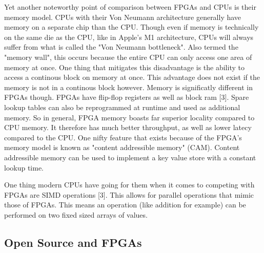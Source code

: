 \documentclass{article}
\begin{document}
    Yet another noteworthy point of comparison between FPGAs and CPUs is their memory model.
    CPUs with their Von Neumann architecture generally have memory on a separate chip
    than the CPU. Though even if memory is technically on the same die as the CPU, like in Apple's
    M1 architecture, CPUs will always suffer from what is called the "Von Neumann bottleneck".
    Also termed the "memory wall", this occurs because the entire CPU can only access one area
    of memory at once. One thing that mitigates this disadvantage is the ability to
    access a continous block on memory at once. This advantage does not exist if the memory
    is not in a continous block however. Memory is significatly different in FPGAs though.
    FPGAs have flip-flop registers as well as block ram [3]. Spare lookup tables can
    also be reprogrammed at runtime and used as additional memory. So in general, FPGA memory
    boasts far superior locality compared to CPU memory. It therefore has much better
    throughput, as well as lower latecy compared to the CPU.
    One nifty feature that exists because of the FPGA's memory model is known as
    "content addressible memory" (CAM). Content addressible memory can be used
    to implement a key value store with a constant lookup time.

    One thing modern CPUs have going for them when it comes to competing with FPGAs are
    SIMD operations [3]. This allows for parallel operations that mimic those of FPGAs.
    This means an operation (like addition for example) can be performed on two fixed
    sized arrays of values.

    \subsection{Open Source and FPGAs}
\end{document}
